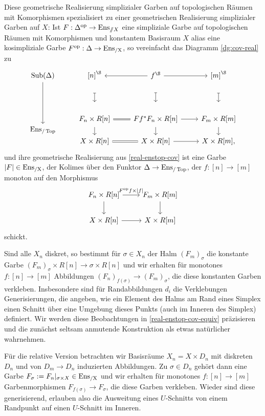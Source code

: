 \begin{bem} \label{real-ensx-cov}
  Diese geometrische Realisierung simplizialer Garben auf
  topologischen Räumen mit Komorphismen spezialisiert zu einer
  geometrischen Realisierung simplizialer Garben auf $X$: Ist $F:
  \Delta^\mathrm{op} \to \operatorname{Ens}_{\mathbin{/\mkern-6mu/} X}$ eine simpliziale Garbe auf
  topologischen Räumen mit Komorphismen und konstantem Basisraum $X$
  alias eine kosimpliziale Garbe $F^\mathrm{op}: \Delta \to \operatorname{Ens_{/X}}$, so
  vereinfacht das Diagramm \ref{dg:cov-real} zu
  \[
  \begin{tikzcd}
    \Sub(\Delta) \arrow{dd}
    & {[n]}^\S \dar[mapsto, shorten <= 3em, yshift=1.5em]
    & \lar f^\S \dar[mapsto, shorten <= 3em, yshift=1.5em] \rar
    & {[m]}^\S \dar[mapsto, shorten <= 3em, yshift=1.5em] \\[25]
    & F_n \times R[n]
    & \lar[equal] Ff^* F_n \times R[n] \rar
    & F_m \times R[m] \\[-2em]
    \Ens_{/\Top}
    & \dar[shorten <= -1em]
    & \dar[shorten <= -1em]
    & \dar[shorten <= -1em] \\[-2em]
    & X \times R[n]
    & \lar[equal] X \times R[n] \rar
    & X \times R[m],
  \end{tikzcd}
  \]
  und ihre geometrische Realisierung aus \ref{real-enstop-cov} ist
  eine Garbe $|F| \in \operatorname{Ens_{/X}}$, der Kolimes über den Funktor $\Delta \to
  \operatorname{Ens}_{/\operatorname{Top}}$, der $f: [n] \to [m]$ monoton auf den Morphismus
  \[ \begin{tikzcd}
    F_n \times R[n] \dar \rar{F\op f \times |f|}
    & F_m \times R[m] \dar \\
    X \times R[n] \rar
    & X \times R[m]
  \end{tikzcd} \]
  schickt.

  Sind alle $X_n$ diskret, so bestimmt für $\sigma \in X_n$ der Halm
  $(F_m)_\sigma$ die konstante Garbe $(F_m)_\sigma \times R[n] \to
  {\sigma} \times R[n]$ und wir erhalten für monotones $f: [n] \to
  [m]$ Abbildungen $(F_n)_{f(\sigma)} \to (F_m)_\sigma$, die diese
  konstanten Garben verkleben. Insbesondere sind für Randabbildungen
  $d_i$ die Verklebungen Generisierungen, die angeben, wie ein Element
  des Halms am Rand eines Simplex einen Schnitt über eine Umgebung
  dieses Punkts (auch im Inneren des Simplex) definiert. Wir werden
  diese Beobachtungen in \ref{real-enstop-cov-equiv} präzisieren und
  die zunächst seltsam anmutende Konstruktion als etwas natürlicher
  wahrnehmen.

  Für die relative Version betrachten wir Basisräume $X_n = X \times
  D_n$ mit diskreten $D_n$ und von $D_m \to D_n$ induzierten
  Abbildungen. Zu $\sigma \in D_n$ gehört dann eine Garbe $F_\sigma :=
  F_n|_{\sigma \times X} \in \operatorname{Ens_{/X}}$ und wir erhalten für monotones $f:
  [n] \to [m]$ Garbenmorphismen $F_{f(\sigma)} \to F_\sigma$, die
  diese Garben verkleben. Wieder sind diese generisierend, erlauben
  also die Ausweitung eines $U$-Schnitts von einem Randpunkt auf einen
  $U$-Schnitt im Inneren.
\end{bem}

